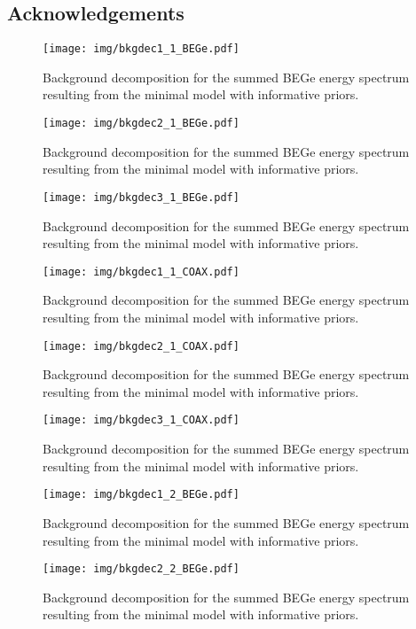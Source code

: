 \subsection*{Acknowledgements}

\begin{landscape}
	\begin{figure}
		\centering
		\texttt{[image: img/bkgdec1\_1\_BEGe.pdf]}
		\caption{Background decomposition for the summed BEGe energy spectrum resulting from the minimal model with informative priors.}
	\end{figure}
	\begin{figure}
		\centering
		\texttt{[image: img/bkgdec2\_1\_BEGe.pdf]}
		\caption{Background decomposition for the summed BEGe energy spectrum resulting from the minimal model with informative priors.}
	\end{figure}
	\begin{figure}
		\centering
		\texttt{[image: img/bkgdec3\_1\_BEGe.pdf]}
		\caption{Background decomposition for the summed BEGe energy spectrum resulting from the minimal model with informative priors.}
	\end{figure}
	\begin{figure}
		\centering
		\texttt{[image: img/bkgdec1\_1\_COAX.pdf]}
		\caption{Background decomposition for the summed BEGe energy spectrum resulting from the minimal model with informative priors.}
	\end{figure}
	\begin{figure}
		\centering
		\texttt{[image: img/bkgdec2\_1\_COAX.pdf]}
		\caption{Background decomposition for the summed BEGe energy spectrum resulting from the minimal model with informative priors.}
	\end{figure}
	\begin{figure}
		\centering
		\texttt{[image: img/bkgdec3\_1\_COAX.pdf]}
		\caption{Background decomposition for the summed BEGe energy spectrum resulting from the minimal model with informative priors.}
	\end{figure}
	\begin{figure}
		\centering
		\texttt{[image: img/bkgdec1\_2\_BEGe.pdf]}
		\caption{Background decomposition for the summed BEGe energy spectrum resulting from the minimal model with informative priors.}
	\end{figure}
	\begin{figure}
		\centering
		\texttt{[image: img/bkgdec2\_2\_BEGe.pdf]}
		\caption{Background decomposition for the summed BEGe energy spectrum resulting from the minimal model with informative priors.}

\end{figure}
\end{landscape}
